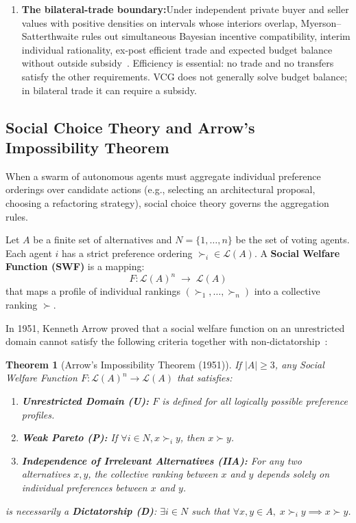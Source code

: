 \documentclass[11pt,a4paper]{article}
\newtheorem{theorem}{Theorem}[section]
\begin{document}
\begin{enumerate}[leftmargin=1.8em,itemsep=3pt]
  \item \textbf{The bilateral-trade boundary:}\enspace Under independent private buyer and seller values with positive densities on intervals whose interiors overlap, Myerson--Satterthwaite rules out simultaneous Bayesian incentive compatibility, interim individual rationality, ex-post efficient trade and expected budget balance without outside subsidy~. Efficiency is essential: no trade and no transfers satisfy the other requirements. VCG does not generally solve budget balance; in bilateral trade it can require a subsidy.

\end{enumerate}

\subsection{Social Choice Theory and Arrow's Impossibility Theorem}

When a swarm of autonomous agents must aggregate individual preference orderings over candidate actions (e.g., selecting an architectural proposal, choosing a refactoring strategy), social choice theory governs the aggregation rules.

Let $A$ be a finite set of alternatives and $N = \{1, \dots, n\}$ be the set of voting agents. Each agent $i$ has a strict preference ordering $\succ_i \in \mathcal{L}(A)$. A \textbf{Social Welfare Function (SWF)} is a mapping:
\begin{equation}
F: \mathcal{L}(A)^n \;\to\; \mathcal{L}(A)
\end{equation}
that maps a profile of individual rankings $(\succ_1, \dots, \succ_n)$ into a collective ranking $\succ$.

In 1951, Kenneth Arrow proved that a social welfare function on an unrestricted domain cannot satisfy the following criteria together with non-dictatorship~:

\begin{theorem}[Arrow's Impossibility Theorem (1951)]\label{thm:arrow}
If $|A| \ge 3$, any Social Welfare Function $F: \mathcal{L}(A)^n \to \mathcal{L}(A)$ that satisfies:
\begin{enumerate}[leftmargin=1.5em,itemsep=1.5pt]
  \item \textbf{Unrestricted Domain (U):} $F$ is defined for all logically possible preference profiles.
  \item \textbf{Weak Pareto (P):} If $\forall i \in N, x \succ_i y$, then $x \succ y$.
  \item \textbf{Independence of Irrelevant Alternatives (IIA):} For any two alternatives $x, y$, the collective ranking between $x$ and $y$ depends solely on individual preferences between $x$ and $y$.
\end{enumerate}
is necessarily a \textbf{Dictatorship (D)}: $\exists i \in N$ such that $\forall x, y \in A, \; x \succ_i y \implies x \succ y$.
\end{theorem}
\end{document}
